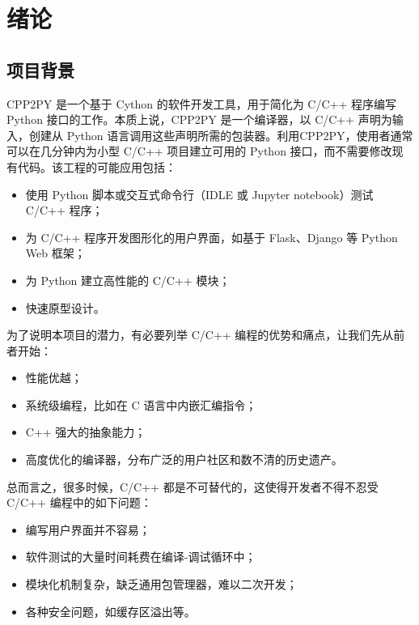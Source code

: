 
\chapter{绪论}

\section{项目背景}

CPP2PY \cite{bestoftwo}是一个基于 Cython 的软件开发工具，用于简化为 C/C++ 程序编写 Python 接口的工作。本质上说，CPP2PY 是一个编译器，以 C/C++ 声明为输入，创建从 Python 语言调用这些声明所需的包装器。利用CPP2PY，使用者通常可以在几分钟内为小型 C/C++ 项目建立可用的 Python 接口，而不需要修改现有代码。该工程的可能应用包括：

\begin{itemize}
    \item 使用 Python 脚本或交互式命令行（IDLE 或 Jupyter notebook）测试 C/C++ 程序；
    \item 为 C/C++ 程序开发图形化的用户界面，如基于 Flask、Django 等 Python Web 框架；
    \item 为 Python 建立高性能的 C/C++ 模块；
    \item 快速原型设计。
\end{itemize}

为了说明本项目的潜力，有必要列举 C/C++ 编程的优势和痛点，让我们先从前者开始：

\begin{itemize}
    \item 性能优越；
    \item 系统级编程，比如在 C 语言中内嵌汇编指令；
    \item C++ 强大的抽象能力；
    \item 高度优化的编译器，分布广泛的用户社区和数不清的历史遗产。
\end{itemize}

总而言之，很多时候，C/C++ 都是不可替代的，这使得开发者不得不忍受 C/C++ 编程中的如下问题：

\begin{itemize}
    \item 编写用户界面并不容易；
    \item 软件测试的大量时间耗费在编译-调试循环中；
    \item 模块化机制复杂，缺乏通用包管理器，难以二次开发；
    \item 各种安全问题，如缓存区溢出等。
\end{itemize}

